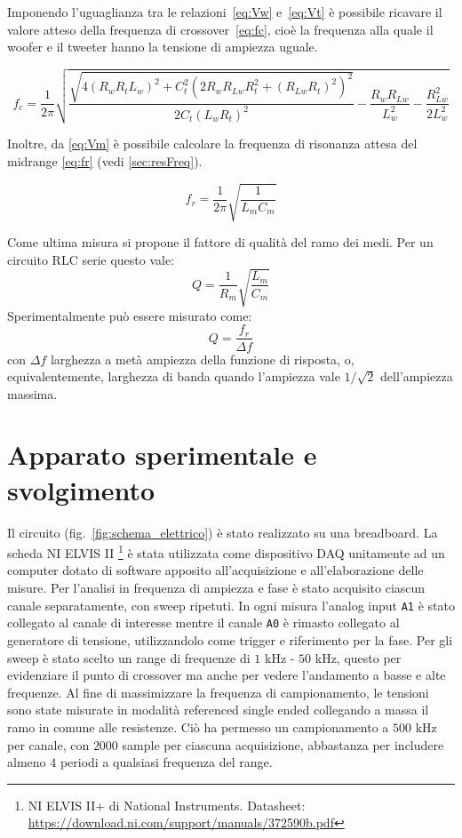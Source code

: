 \documentclass[12pt,italian]{article}
\begin{document}
Imponendo l'uguaglianza tra le relazioni~\eqref{eq:Vw} e~\eqref{eq:Vt} è
possibile ricavare il valore atteso della frequenza di crossover~\eqref{eq:fc},
cioè la frequenza alla quale il woofer e il tweeter hanno la tensione di
ampiezza uguale.

\begin{equation}
	f_{c} = \frac{1}{2\pi}\sqrt{\frac{\sqrt{4 (R_{w} R_{t} L_{w})^2 + C_{t}^2(2
				R_{w} R_{Lw} R_{t}^2 + (R_{Lw} R_{t})^2)^2}}{2 C _{t} (L_{w} R_{t})^2 } -
		\frac{R_{w} R_{Lw}}{L_{w}^2} - \frac{R_{Lw}^2}{2 L_{w}^2}}
	\label{eq:fc}
\end{equation}

Inoltre, da \eqref{eq:Vm} è possibile calcolare la frequenza di risonanza
attesa del midrange \eqref{eq:fr} (vedi \cref{sec:resFreq}).

\begin{equation}
	f_{r} = \frac{1}{2\pi}\sqrt{\frac{1}{L_{m} C_{m}}}  %
	\label{eq:fr}
\end{equation}

Come ultima misura si propone il fattore di qualità del ramo dei medi. Per un
circuito RLC serie questo vale: \begin{equation*} Q =
	\frac{1}{R_m}\sqrt{\frac{L_m}{C_m}} \end{equation*} Sperimentalmente può essere
misurato come: \begin{equation*} Q = \frac{f_r}{\Delta f} \end{equation*} con
$\Delta f$ larghezza a metà ampiezza della funzione di risposta, o,
equivalentemente, larghezza di banda quando l'ampiezza vale $1/\sqrt{2}$
dell'ampiezza massima.

\section*{Apparato sperimentale e svolgimento}

Il circuito (fig.~\ref{fig:schema_elettrico}) è stato realizzato su una
breadboard. La scheda NI ELVIS II \footnote{NI ELVIS II+ di National
	Instruments. Datasheet:
	\url{https://download.ni.com/support/manuals/372590b.pdf}} è stata utilizzata
come dispositivo DAQ unitamente ad un computer dotato di software apposito
all'acquisizione e all'elaborazione delle misure. Per l'analisi in frequenza di
ampiezza e fase è stato acquisito ciascun canale separatamente, con sweep
ripetuti. In ogni misura l'analog input \texttt{A1} è stato collegato al canale
di interesse mentre il canale \texttt{A0} è rimasto collegato al generatore di
tensione, utilizzandolo come trigger e riferimento per la fase. Per gli sweep è
stato scelto un range di frequenze di $1$ kHz - $50$ kHz, questo per
evidenziare il punto di crossover ma anche per vedere l'andamento a basse e
alte frequenze. Al fine di massimizzare la frequenza di campionamento, le
tensioni sono state misurate in modalità referenced single ended collegando a
massa il ramo in comune alle resistenze. Ciò ha permesso un campionamento a
$500$ kHz per canale, con $2000$ sample per ciascuna acquisizione, abbastanza
per includere almeno $4$ periodi a qualsiasi frequenza del range.
\end{document}
